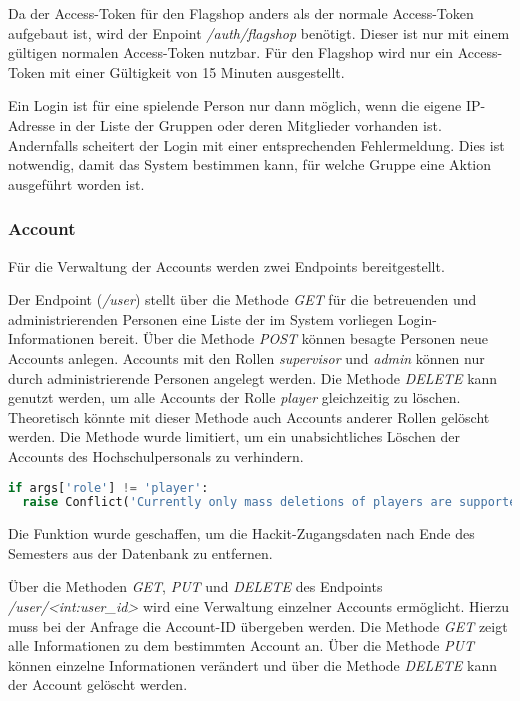 Da der Access-Token für den Flagshop anders als der normale Access-Token aufgebaut ist, wird der Enpoint \textit{/auth/flagshop} benötigt. Dieser ist nur mit einem gültigen normalen Access-Token nutzbar. Für den Flagshop wird nur ein Access-Token mit einer Gültigkeit von 15 Minuten ausgestellt.

Ein Login ist für eine spielende Person nur dann möglich, wenn die eigene IP-Adresse in der Liste der Gruppen oder deren Mitglieder vorhanden ist. Andernfalls scheitert der Login mit einer entsprechenden Fehlermeldung. Dies ist notwendig, damit das System bestimmen kann, für welche Gruppe eine Aktion ausgeführt worden ist.

\subsubsection{Account}
Für die Verwaltung der Accounts werden zwei Endpoints bereitgestellt. 

Der Endpoint (\textit{/user}) stellt über die Methode \textit{GET} für die betreuenden und administrierenden Personen eine Liste der im System vorliegen Login-Informationen bereit. Über die Methode \textit{POST} können besagte Personen neue Accounts anlegen. Accounts mit den Rollen \textit{supervisor} und \textit{admin} können nur durch administrierende Personen angelegt werden. Die Methode \textit{DELETE} kann genutzt werden, um alle Accounts der Rolle \textit{player} gleichzeitig zu löschen. Theoretisch könnte mit dieser Methode auch Accounts anderer Rollen gelöscht werden. Die Methode wurde limitiert, um ein unabsichtliches Löschen der Accounts des Hochschulpersonals zu verhindern.

\begin{lstlisting}[language=Python, frame=single, caption={GIS Löschen auf player-Accounts begrenzen}, captionpos=b, label={lst:gis-delete-all-players}]
if args['role'] != 'player':
  raise Conflict('Currently only mass deletions of players are supported.')
\end{lstlisting}

Die Funktion wurde geschaffen, um die Hackit-Zugangsdaten nach Ende des Semesters aus der Datenbank zu entfernen.

Über die Methoden \textit{GET}, \textit{PUT} und \textit{DELETE} des Endpoints \textit{/user/<int:user\_id>} wird eine Verwaltung einzelner Accounts ermöglicht. Hierzu muss bei der Anfrage die Account-ID übergeben werden. Die Methode \textit{GET} zeigt alle Informationen zu dem bestimmten Account an. Über die Methode \textit{PUT} können einzelne Informationen verändert und über die Methode \textit{DELETE} kann der Account gelöscht werden.

